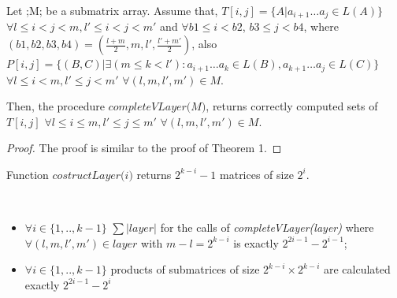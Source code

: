 \begin{theorem}
Let ;M; be a submatrix array. Assume that, $T[i, j] =  \{ A |  a_{i + 1} \dots a_{j} \in L(A)\}$ $\forall l \leq i < j < m,  l' \leq i < j < m'$ and $\forall b1 \leq i < b2$,  $b3 \leq j < b4$, where $(b1, b2, b3, b4) = (\frac{l+m}{2}, m, l', \frac{l'+m'}{2})$, also $P[i, j] =  \{ (B, C) |\exists (m \le k < l'): a_{i + 1} \dots a_{k} \in L(B), a_{k + 1} \dots a_{j} \in L(C)\}$ $\forall l \leq i < m,  l' \leq j < m'$ $\forall (l, m, l', m') \in M$.

Then, the procedure $\textit{completeVLayer(M)}$, returns correctly computed sets of $T[i, j]$ $\forall l \leq i \le m,  l' \leq j \le m'$ $\forall (l, m, l', m') \in M$.
\end{theorem}

\begin{proof}
The proof is similar to the proof of Theorem 1.
\end{proof}

\begin{note}
Function $\textit{costructLayer(i)}$ returns $2^{k - i} - 1$ matrices of size $2^i$.
\end{note}

\begin{lemma}
\
\begin{itemize}
 \item $\forall i \in \{ 1, .., k - 1\}$  $\sum{|layer|}$ for the calls of \textit{completeVLayer(layer)} where $\forall (l, m, l', m') \in layer$ with $m - l = 2^{k - i}$  is exactly $2^{2i - 1} - 2^{i - 1}$;
 \item $\forall i \in \{ 1, .., k - 1\}$ products of submatrices of size $2^{k - i} \times 2^{k - i}$ are calculated exactly $2^{2i - 1} - 2^{i}$
\end{itemize}
\end{lemma}

